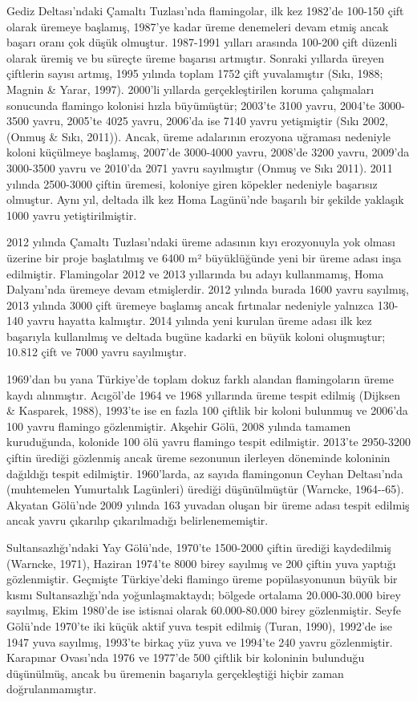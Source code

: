 \documentclass[
  a4paper,
  DIV=11,
  numbers=noendperiod]{scrreprt}
\begin{document}
Gediz Deltası'ndaki Çamaltı Tuzlası'nda flamingolar, ilk kez 1982'de
100-150 çift olarak üremeye başlamış, 1987'ye kadar üreme denemeleri
devam etmiş ancak başarı oranı çok düşük olmuştur. 1987-1991 yılları
arasında 100-200 çift düzenli olarak üremiş ve bu süreçte üreme başarısı
artmıştır. Sonraki yıllarda üreyen çiftlerin sayısı artmış, 1995 yılında
toplam 1752 çift yuvalamıştır (Sıkı, 1988; Magnin \& Yarar, 1997).
2000'li yıllarda gerçekleştirilen koruma çalışmaları sonucunda flamingo
kolonisi hızla büyümüştür; 2003'te 3100 yavru, 2004'te 3000-3500 yavru,
2005'te 4025 yavru, 2006'da ise 7140 yavru yetişmiştir (Sıkı 2002,
(Onmuş \& Sıkı, 2011)). Ancak, üreme adalarının erozyona uğraması
nedeniyle koloni küçülmeye başlamış, 2007'de 3000-4000 yavru, 2008'de
3200 yavru, 2009'da 3000-3500 yavru ve 2010'da 2071 yavru sayılmıştır
(Onmuş ve Sıkı 2011). 2011 yılında 2500-3000 çiftin üremesi, koloniye
giren köpekler nedeniyle başarısız olmuştur. Aynı yıl, deltada ilk kez
Homa Lagünü'nde başarılı bir şekilde yaklaşık 1000 yavru
yetiştirilmiştir.

2012 yılında Çamaltı Tuzlası'ndaki üreme adasının kıyı erozyonuyla yok
olması üzerine bir proje başlatılmış ve 6400 m² büyüklüğünde yeni bir
üreme adası inşa edilmiştir. Flamingolar 2012 ve 2013 yıllarında bu
adayı kullanmamış, Homa Dalyanı'nda üremeye devam etmişlerdir. 2012
yılında burada 1600 yavru sayılmış, 2013 yılında 3000 çift üremeye
başlamış ancak fırtınalar nedeniyle yalnızca 130-140 yavru hayatta
kalmıştır. 2014 yılında yeni kurulan üreme adası ilk kez başarıyla
kullanılmış ve deltada bugüne kadarki en büyük koloni oluşmuştur; 10.812
çift ve 7000 yavru sayılmıştır.

1969'dan bu yana Türkiye'de toplam dokuz farklı alandan flamingoların
üreme kaydı alınmıştır. Acıgöl'de 1964 ve 1968 yıllarında üreme tespit
edilmiş (Dijksen \& Kasparek, 1988), 1993'te ise en fazla 100 çiftlik
bir koloni bulunmuş ve 2006'da 100 yavru flamingo gözlenmiştir. Akşehir
Gölü, 2008 yılında tamamen kuruduğunda, kolonide 100 ölü yavru flamingo
tespit edilmiştir. 2013'te 2950-3200 çiftin ürediği gözlenmiş ancak
üreme sezonunun ilerleyen döneminde koloninin dağıldığı tespit
edilmiştir. 1960'larda, az sayıda flamingonun Ceyhan Deltası'nda
(muhtemelen Yumurtalık Lagünleri) ürediği düşünülmüştür (Warncke,
1964-\/-65). Akyatan Gölü'nde 2009 yılında 163 yuvadan oluşan bir üreme
adası tespit edilmiş ancak yavru çıkarılıp çıkarılmadığı
belirlenememiştir.

Sultansazlığı'ndaki Yay Gölü'nde, 1970'te 1500-2000 çiftin ürediği
kaydedilmiş (Warncke, 1971), Haziran 1974'te 8000 birey sayılmış ve 200
çiftin yuva yaptığı gözlenmiştir. Geçmişte Türkiye'deki flamingo üreme
popülasyonunun büyük bir kısmı Sultansazlığı'nda yoğunlaşmaktaydı;
bölgede ortalama 20.000-30.000 birey sayılmış, Ekim 1980'de ise istisnai
olarak 60.000-80.000 birey gözlenmiştir. Seyfe Gölü'nde 1970'te iki
küçük aktif yuva tespit edilmiş (Turan, 1990), 1992'de ise 1947 yuva
sayılmış, 1993'te birkaç yüz yuva ve 1994'te 240 yavru gözlenmiştir.
Karapınar Ovası'nda 1976 ve 1977'de 500 çiftlik bir koloninin bulunduğu
düşünülmüş, ancak bu üremenin başarıyla gerçekleştiği hiçbir zaman
doğrulanmamıştır.
\end{document}
